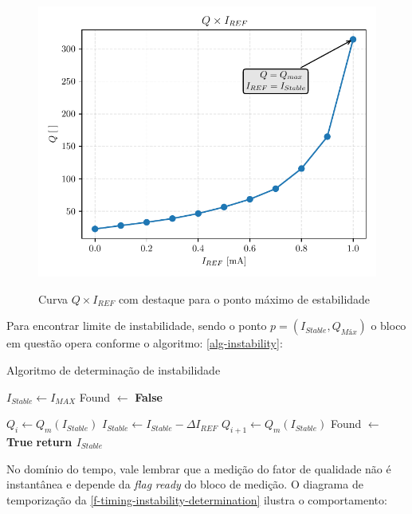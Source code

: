 \begin{figure}[H]
    \centering
    \caption{Curva $Q \times I_{REF}$ com destaque para o ponto máximo de estabilidade}
    \includegraphics[width=.7\textwidth]{fig/q-iref-q_max-i_stable.pdf}
    \label{f-timedomain-q-iref-qmax-istable}
\end{figure}


Para encontrar limite de instabilidade, sendo o ponto $p = (I_{Stable}, Q_{Máx})$ o bloco em questão opera conforme o algoritmo: \autoref{alg-instability}:

\begin{algorithm}[H]
\caption{Algoritmo de determinação de instabilidade}\label{alg-instability}
\begin{algorithmic}[1]


\State $I_{Stable} \gets I_{MAX}$ 
\State Found $\gets$ \textbf{False}

    
    \State $Q_i \gets Q_m(I_{Stable})$
    \State $I_{Stable} \gets I_{Stable}  - \Delta I_{REF}$
    \State $Q_{i+1} \gets Q_m(I_{Stable})$
        \State Found $\gets$ \textbf{True}
    \EndIf
\EndWhile
\State \textbf{return $I_{Stable}$}
\end{algorithmic}
\end{algorithm}




No domínio do tempo, vale lembrar que a medição do fator de qualidade não é instantânea e depende da \textit{\textit{flag}} \textit{ready} do bloco de medição. O diagrama de temporização da \autoref{f-timing-instability-determination} ilustra o comportamento: 

